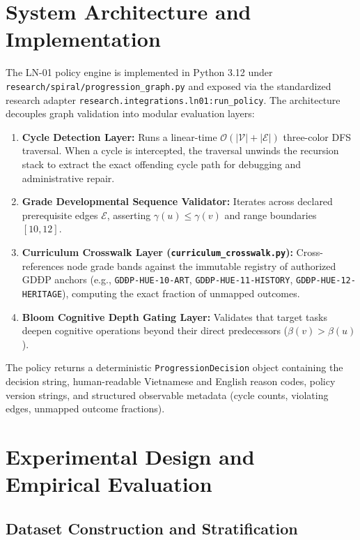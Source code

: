 \documentclass[11pt,a4paper]{article}
\begin{document}
\section{System Architecture and Implementation}

The LN-01 policy engine is implemented in Python 3.12 under \texttt{research/spiral/progression\_graph.py} and exposed via the standardized research adapter \texttt{research.integrations.ln01:run\_policy}. The architecture decouples graph validation into modular evaluation layers:

\begin{enumerate}
    \item \textbf{Cycle Detection Layer:} Runs a linear-time $\mathcal{O}(|\mathcal{V}| + |\mathcal{E}|)$ three-color DFS traversal. When a cycle is intercepted, the traversal unwinds the recursion stack to extract the exact offending cycle path for debugging and administrative repair.
    \item \textbf{Grade Developmental Sequence Validator:} Iterates across declared prerequisite edges $\mathcal{E}$, asserting $\gamma(u) \le \gamma(v)$ and range boundaries $[10, 12]$.
    \item \textbf{Curriculum Crosswalk Layer (\texttt{curriculum\_crosswalk.py}):} Cross-references node grade bands against the immutable registry of authorized GDĐP anchors (e.g., \texttt{GDĐP-HUE-10-ART}, \texttt{GDĐP-HUE-11-HISTORY}, \texttt{GDĐP-HUE-12-HERITAGE}), computing the exact fraction of unmapped outcomes.
    \item \textbf{Bloom Cognitive Depth Gating Layer:} Validates that target tasks deepen cognitive operations beyond their direct predecessors ($\beta(v) > \beta(u)$).
\end{enumerate}

The policy returns a deterministic \texttt{ProgressionDecision} object containing the decision string, human-readable Vietnamese and English reason codes, policy version strings, and structured observable metadata (cycle counts, violating edges, unmapped outcome fractions).

\section{Experimental Design and Empirical Evaluation}

\subsection{Dataset Construction and Stratification}
\end{document}
